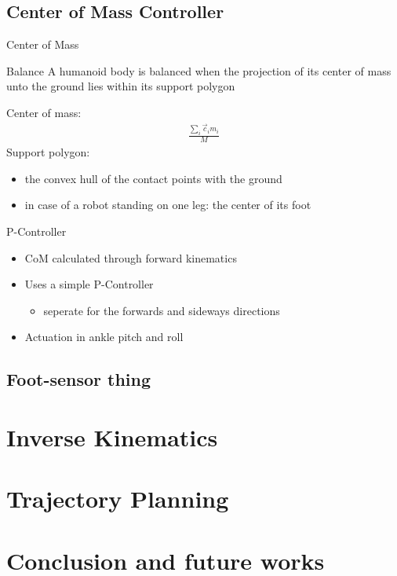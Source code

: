 \documentclass{beamer}
\begin{document}
\subsection{Center of Mass Controller}
\begin{frame}{Center of Mass}
  \begin{block}{Balance}
    A humanoid body is balanced when the projection of its center of
mass unto the ground lies within its support polygon
  \end{block}
  Center of mass:
  \begin{align*}
    \frac{\sum_i \vec{c}_i m_i}{M}
  \end{align*}
  Support polygon:
  \begin{itemize}
    \item the convex hull of the contact points with the ground
    \item in case of a robot standing on one leg: the center of its foot
  \end{itemize}
\end{frame}

\begin{frame}{P-Controller}
  \begin{itemize}
    \item CoM calculated through forward kinematics
    \item Uses a simple P-Controller
    \begin{itemize}
      \item seperate for the forwards and sideways directions
    \end{itemize}
    \item Actuation in ankle pitch and roll
  \end{itemize}
\end{frame}

\subsection{Foot-sensor thing}

\section{Inverse Kinematics}

\section{Trajectory Planning}

\section{Conclusion and future works}
\end{document}
